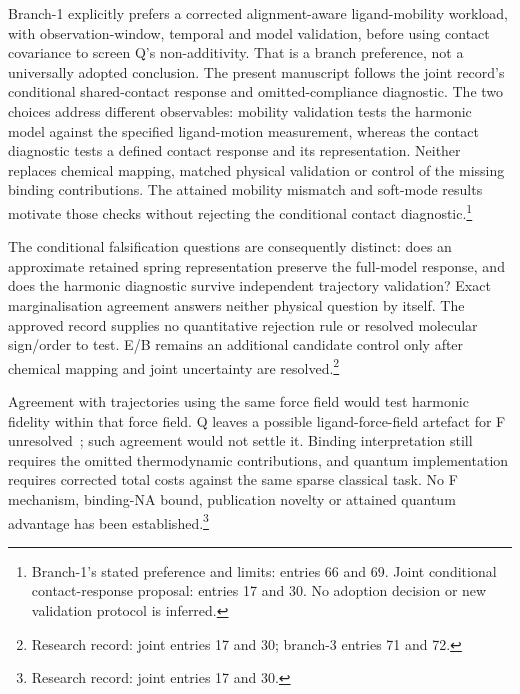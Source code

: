 \documentclass{article}
\begin{document}
Branch-1 explicitly prefers a corrected alignment-aware ligand-mobility workload, with observation-window, temporal and model validation, before using contact covariance to screen Q's non-additivity. That is a branch preference, not a universally adopted conclusion. The present manuscript follows the joint record's conditional shared-contact response and omitted-compliance diagnostic. The two choices address different observables: mobility validation tests the harmonic model against the specified ligand-motion measurement, whereas the contact diagnostic tests a defined contact response and its representation. Neither replaces chemical mapping, matched physical validation or control of the missing binding contributions. The attained mobility mismatch and soft-mode results motivate those checks without rejecting the conditional contact diagnostic.\footnote{Branch-1's stated preference and limits: entries 66 and 69. Joint conditional contact-response proposal: entries 17 and 30. No adoption decision or new validation protocol is inferred.}

The conditional falsification questions are consequently distinct: does an approximate retained spring representation preserve the full-model response, and does the harmonic diagnostic survive independent trajectory validation? Exact marginalisation agreement answers neither physical question by itself. The approved record supplies no quantitative rejection rule or resolved molecular sign/order to test. E/B remains an additional candidate control only after chemical mapping and joint uncertainty are resolved.\footnote{Research record: joint entries 17 and 30; branch-3 entries 71 and 72.}

Agreement with trajectories using the same force field would test harmonic fidelity within that force field. Q leaves a possible ligand-force-field artefact for F unresolved~\cite{Q}; such agreement would not settle it. Binding interpretation still requires the omitted thermodynamic contributions, and quantum implementation requires corrected total costs against the same sparse classical task. No F mechanism, binding-NA bound, publication novelty or attained quantum advantage has been established.\footnote{Research record: joint entries 17 and 30.}

\clearpage


\end{document}

